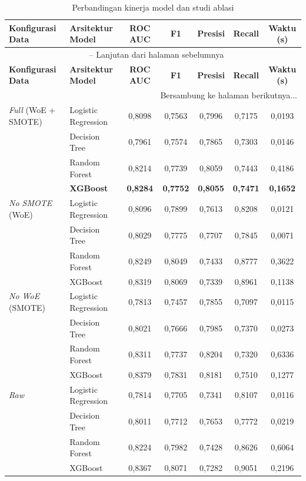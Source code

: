 \begin{scriptsize}
\setlength{\tabcolsep}{3pt}
\renewcommand{\arraystretch}{1.1}
\begin{longtable}{p{} p{} c c c c c}
\caption{Perbandingan kinerja model dan studi ablasi}
\label{tab:bab4_ablation_study} \\
\toprule
\textbf{Konfigurasi Data} & \textbf{Arsitektur Model} & \textbf{ROC AUC} & \textbf{F1} & \textbf{Presisi} & \textbf{Recall} & \textbf{Waktu (s)} \\
\midrule
\endfirsthead
\multicolumn{7}{c}{{\tablename\ \thetable{} -- Lanjutan dari halaman sebelumnya}} \\
\toprule
\textbf{Konfigurasi Data} & \textbf{Arsitektur Model} & \textbf{ROC AUC} & \textbf{F1} & \textbf{Presisi} & \textbf{Recall} & \textbf{Waktu (s)} \\
\midrule
\endhead
\midrule
\multicolumn{7}{r}{{Bersambung ke halaman berikutnya...}} \\
\endfoot
\bottomrule
\endlastfoot
\textit{Full} (WoE + SMOTE) & Logistic Regression & 0,8098 & 0,7563 & 0,7996 & 0,7175 & 0,0193 \\
 & Decision Tree & 0,7961 & 0,7574 & 0,7865 & 0,7303 & 0,0146 \\
 & Random Forest & 0,8214 & 0,7739 & 0,8059 & 0,7443 & 0,4186 \\
 & \textbf{XGBoost} & \textbf{0,8284} & \textbf{0,7752} & \textbf{0,8055} & \textbf{0,7471} & \textbf{0,1652} \\
\midrule
\textit{No SMOTE} (WoE) & Logistic Regression & 0,8096 & 0,7899 & 0,7613 & 0,8208 & 0,0121 \\
 & Decision Tree & 0,8029 & 0,7775 & 0,7707 & 0,7845 & 0,0071 \\
 & Random Forest & 0,8249 & 0,8049 & 0,7433 & 0,8777 & 0,3622 \\
 & XGBoost & 0,8319 & 0,8069 & 0,7339 & 0,8961 & 0,1138 \\
\midrule
\textit{No WoE} (SMOTE) & Logistic Regression & 0,7813 & 0,7457 & 0,7855 & 0,7097 & 0,0115 \\
 & Decision Tree & 0,8021 & 0,7666 & 0,7985 & 0,7370 & 0,0273 \\
 & Random Forest & 0,8311 & 0,7737 & 0,8204 & 0,7320 & 0,6336 \\
 & XGBoost & 0,8379 & 0,7831 & 0,8181 & 0,7510 & 0,1277 \\
\midrule
\textit{Raw} & Logistic Regression & 0,7814 & 0,7705 & 0,7341 & 0,8107 & 0,0116 \\
 & Decision Tree & 0,8011 & 0,7712 & 0,7653 & 0,7772 & 0,0219 \\
 & Random Forest & 0,8224 & 0,7982 & 0,7428 & 0,8626 & 0,6064 \\
 & XGBoost & 0,8367 & 0,8071 & 0,7282 & 0,9051 & 0,2196 \\
\end{longtable}
\renewcommand{\arraystretch}{1}
\end{scriptsize}

